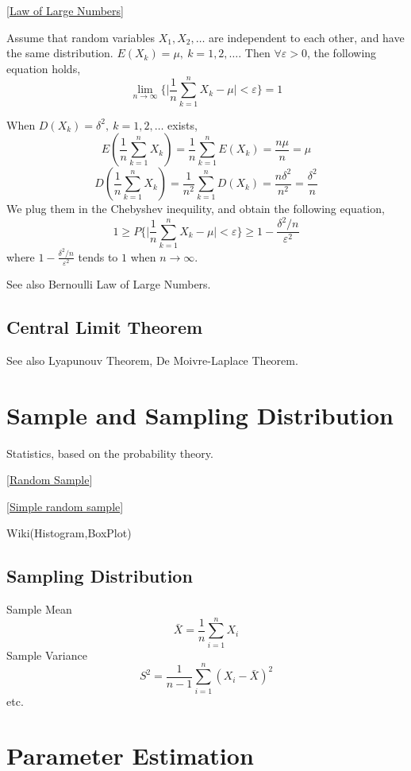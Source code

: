 [\href{https://en.wikipedia.org/wiki/Law_of_large_numbers}{Law of Large Numbers}]

 Assume that random variables $X_1, X_2, \ldots$ are independent to each
 other, and have the same distribution. $E(X_k)=\mu,~k=1,2,\ldots$. Then
 $\forall \varepsilon>0$, the following equation holds,
 $$ \lim\limits_{n\rightarrow\infty} \big\{ \big|
		 \frac{1}{n} \sum\limits_{k=1}^n X_k - \mu
     \big| < \varepsilon \big\} = 1 $$

 When $D(X_k)=\delta^2,~k=1,2,\ldots$ exists,
 $$ E(\frac{1}{n} \sum\limits_{k=1}^n X_k) =
	\frac{1}{n} \sum\limits_{k=1}^n E(X_k) = \frac{n\mu}{n} = \mu$$
 $$ D(\frac{1}{n} \sum\limits_{k=1}^n X_k) =
	\frac{1}{n^2} \sum\limits_{k=1}^n D(X_k) = \frac{n\delta^2}{n^2}
	= \frac{\delta^2}{n} $$
 We plug them in the Chebyshev inequility, and obtain the following equation,
 $$ 1 \geqslant P \big\{ \big| \frac{1}{n} \sum\limits_{k=1}^n X_k - \mu
    \big| < \varepsilon \big\} \geqslant 1 - \frac{\delta^2/n}{\varepsilon^2} $$
 where $ 1 - \frac{\delta^2/n}{\varepsilon^2} $ tends to $1$ when
 $n \rightarrow \infty$.

 See also Bernoulli Law of Large Numbers.

\subsection{Central Limit Theorem}
See also Lyapunouv Theorem, De Moivre-Laplace Theorem.

\section{Sample and Sampling Distribution}

Statistics, based on the probability theory.

[\href{https://en.wikipedia.org/wiki/Random_sample}{Random Sample}]

[\href{https://en.wikipedia.org/wiki/Simple_random_sample}{Simple random sample}]

Wiki(Histogram,BoxPlot)

\subsection{Sampling Distribution}

Sample Mean
$$ \bar{X} = \frac{1}{n} \sum_{i=1}^n X_i $$
Sample Variance
$$ S^2 = \frac{1}{n-1} \sum_{i=1}^n(X_i - \bar{X})^2 $$
etc.

\section{Parameter Estimation}

